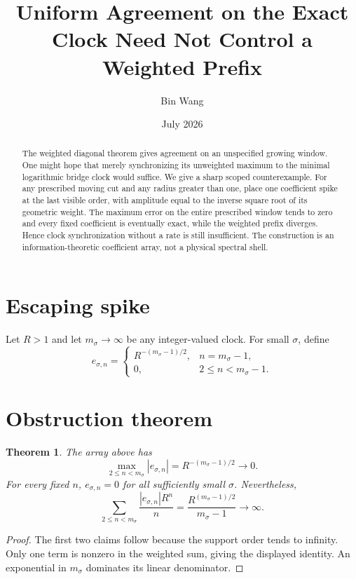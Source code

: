 \documentclass[11pt]{article}
\title{Uniform Agreement on the Exact Clock Need Not Control a Weighted Prefix}
\author{Bin Wang}\date{July 2026}
\newtheorem{theorem}{Theorem}[section]
\theoremstyle{remark}\newtheorem{remark}[theorem]{Remark}
\begin{document}
\maketitle
\begin{abstract}
The weighted diagonal theorem gives agreement on an unspecified growing
window.  One might hope that merely synchronizing its unweighted maximum to
the minimal logarithmic bridge clock would suffice.  We give a sharp scoped
counterexample.  For any prescribed moving cut and any radius greater than
one, place one coefficient spike at the last visible order, with amplitude
equal to the inverse square root of its geometric weight.  The maximum error
on the entire prescribed window tends to zero and every fixed coefficient is
eventually exact, while the weighted prefix diverges.  Hence clock
synchronization without a rate is still insufficient.  The construction is
an information-theoretic coefficient array, not a physical spectral shell.
\end{abstract}

\section{Escaping spike}
Let $R>1$ and let $m_\sigma\to\infty$ be any integer-valued clock.  For small
$\sigma$, define
\[
 e_{\sigma,n}=
 \begin{cases}
 R^{-(m_\sigma-1)/2},&n=m_\sigma-1,\\
 0,&2\le n<m_\sigma-1.
 \end{cases}
\]

\section{Obstruction theorem}
\begin{theorem}\label{thm:spike}
The array above has
\[
 \max_{2\le n<m_\sigma}|e_{\sigma,n}|
 =R^{-(m_\sigma-1)/2}\longrightarrow0.
\]
For every fixed $n$, $e_{\sigma,n}=0$ for all sufficiently small $\sigma$.
Nevertheless,
\[
 \sum_{2\le n<m_\sigma}\frac{|e_{\sigma,n}|R^n}{n}
 =\frac{R^{(m_\sigma-1)/2}}{m_\sigma-1}
 \longrightarrow\infty.
\]
\end{theorem}
\begin{proof}
The first two claims follow because the support order tends to infinity.
Only one term is nonzero in the weighted sum, giving the displayed identity.
An exponential in $m_\sigma$ dominates its linear denominator.
\end{proof}
\end{document}
